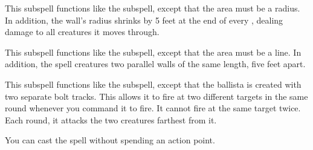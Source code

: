 
This subspell functions like the  subspell, except that the area must be a radius.
In addition, the wall's radius shrinks by 5 feet at the end of every , dealing damage to all creatures it moves through.







This subspell functions like the  subspell, except that the area must be a line.
In addition, the spell creatures two parallel walls of the same length, five feet apart.







This subspell functions like the  subspell, except that the ballista is created with two separate bolt tracks.
This allows it to fire at two different targets in the same round whenever you command it to fire.
It cannot fire at the same target twice.
Each round, it attacks the two creatures farthest from it.






You can cast the spell without spending an action point.




